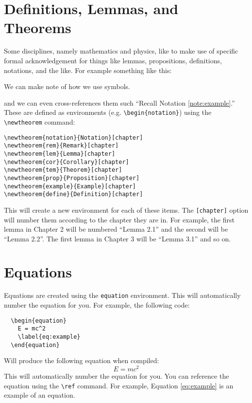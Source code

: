 \documentclass{thesis-dissertation}
\begin{document}
\section{Definitions, Lemmas, and Theorems}
Some disciplines, namely mathematics and physics, like to make use of specific formal acknowledgement for things like lemmas, propositions, definitions, notations, and the like. For example something like this: \begin{notation} We can make note of how we use symbols. \label{note:example}\end{notation} and we can even cross-references them such ``Recall Notation \ref{note:example}.'' These are defined as environments (e.g. \verb|\begin{notation}|) using the \verb|\newtheorem| command: \begin{singlespace}
\begin{verbatim}
\newtheorem{notation}{Notation}[chapter]
\newtheorem{rem}{Remark}[chapter]
\newtheorem{lem}{Lemma}[chapter]
\newtheorem{cor}{Corollary}[chapter]
\newtheorem{tem}{Theorem}[chapter]
\newtheorem{prop}{Proposition}[chapter]
\newtheorem{example}{Example}[chapter]
\newtheorem{define}{Definition}[chapter]
\end{verbatim}
\end{singlespace} This will create a new environment for each of these items. The \verb|[chapter]| option will number them according to the chapter they are in. For example, the first lemma in Chapter 2 will be numbered ``Lemma 2.1'' and the second will be ``Lemma 2.2''. The first lemma in Chapter 3 will be ``Lemma 3.1'' and so on.
\section{Equations}
Equations are created using the \texttt{equation} environment. This will automatically number the equation for you. For example, the following code: \begin{singlespace}
  \begin{verbatim}  
  \begin{equation}
    E = mc^2
    \label{eq:example}
  \end{equation}
  \end{verbatim}\end{singlespace} Will produce the following equation when compiled: \begin{equation}
  E = mc^2
  \label{eq:example}
\end{equation} This will automatically number the equation for you. You can reference the equation using the \verb|\ref| command. For example, Equation \ref{eq:example} is an example of an equation.
\end{document}

